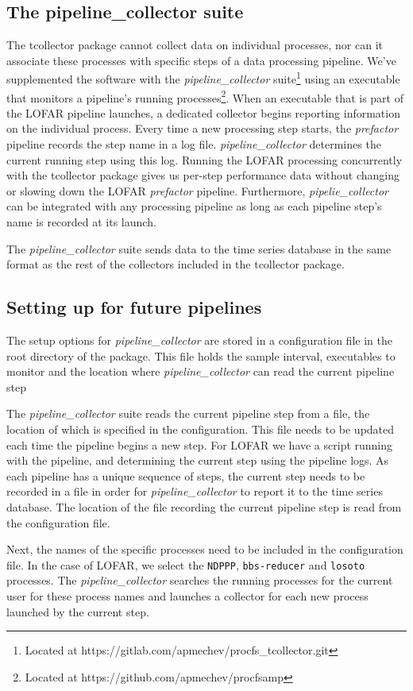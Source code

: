\subsection{The pipeline\_collector suite}\label{sec:customcollectors}



The tcollector package cannot collect data on individual processes, nor can it associate these processes with specific steps of a data processing pipeline. We've supplemented the software with the \textit{pipeline\_collector} suite\footnote{Located at https://gitlab.com/apmechev/procfs\_tcollector.git} using an executable that monitors a pipeline's running processes\footnote{Located at https://github.com/apmechev/procfsamp}. When an executable that is part of the LOFAR pipeline launches, a dedicated collector begins reporting information on the individual process. Every time a new processing step starts, the \textit{prefactor} pipeline records the step name in a log file. \textit{pipeline\_collector} determines the current running step using this log. Running the LOFAR processing concurrently with the tcollector package gives us per-step performance data without changing or slowing down the LOFAR \textit{prefactor} pipeline. Furthermore, \textit{pipelie\_collector} can be integrated with any processing pipeline as long as each pipeline step's name is recorded at its launch. 

The \textit{pipeline\_collector} suite sends data to the time series database in the same format as the rest of the collectors included in the tcollector package. 

\subsection{Setting up for future pipelines}

The setup options for \textit{pipeline\_collector} are stored in a configuration file in the root directory of the package. This file holds the sample interval, executables to monitor and the location where \textit{pipeline\_collector} can read the current pipeline step

The \textit{pipeline\_collector} suite reads the current pipeline step from a file, the location of which is specified in the configuration. This file needs to be updated each time the pipeline begins a new step. For LOFAR we have a script running with the pipeline, and determining the current step using the pipeline logs. As each pipeline has a unique sequence of steps, the current step needs to be recorded in a file in order for \textit{pipeline\_collector} to report it to the time series database. The location of the file recording the current pipeline step is read from the configuration file. 

Next, the names of the specific processes need to be included in the configuration file. In the case of LOFAR, we select the \texttt{NDPPP}, \texttt{bbs-reducer} and \texttt{losoto} processes. The \textit{pipeline\_collector} searches the running processes for the current user for these process names and launches a collector for each new process launched by the current step. 

